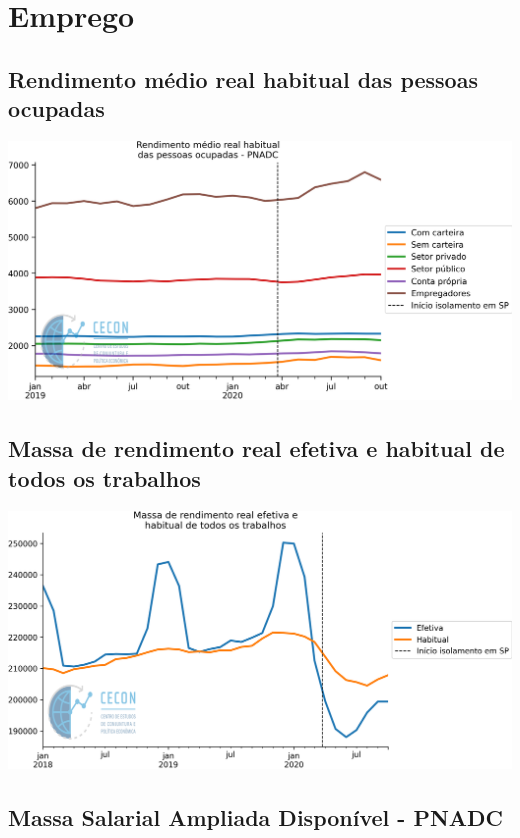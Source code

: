 \documentclass{SelfArx}
\begin{document}
\section*{Emprego}
\label{sec:org4fec7c8}

\subsection*{Rendimento médio real habitual das pessoas ocupadas}
\label{sec:org5d036ed}


\begin{center}
\includegraphics[width=.9\linewidth]{./figs/Emprego/RMHPO.png}
\end{center}

\subsection*{Massa de rendimento real efetiva e habitual de todos os trabalhos}
\label{sec:org3859390}

\begin{center}
\includegraphics[width=.9\linewidth]{./figs/Emprego/MRR_Efetiva_Habitual.png}
\end{center}

\subsection*{Massa Salarial Ampliada Disponível - PNADC}
\label{sec:orgea4e502}
\end{document}
